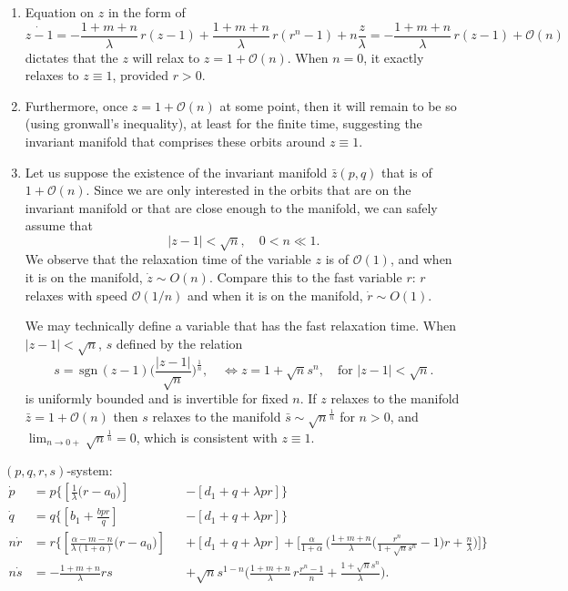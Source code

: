 \documentclass[a4paper,11pt]{article}
\def\sgn{\,\textrm{sgn}\,}
\def\dpp{\dot{p}}
\def\dqq{\dot{q}}
\def\drr{\dot{r}}
\def\dss{\dot{s}}
\begin{document}
\begin{enumerate}
 \item  Equation on $z$ in the form of
 $$ \dot{z-1} = -\frac{1+m+n}{\lambda}\, r (z-1) + \frac{1+m+n}{\lambda}\, r(r^n-1) + n\frac{z}{\lambda} = -\frac{1+m+n}{\lambda}\, r (z-1) + \mathcal{O}(n)$$
 dictates that the $z$ will relax to $z=1 + \mathcal{O}(n)$. When $n=0$, it exactly relaxes to $z\equiv1$, provided $r>0$.
 \item Furthermore, once $z = 1+\mathcal{O}(n)$ at some point, then it will remain to be so (using gronwall's inequality), at least for the finite time, suggesting the invariant manifold that comprises these orbits around $z\equiv1$.
 \item Let us suppose the existence of the invariant manifold $\bar{z}(p,q)$ that is of $1+\mathcal{O}(n)$. Since we are only interested in the orbits that are on the invariant manifold or that are close enough to the manifold, we can safely assume that
 $$ |z-1| < \sqrt{n}, \quad 0<n\ll1.$$
 We observe that the relaxation time of the variable $z$ is of $\mathcal{O}(1)$, and when it is on the manifold, $\dot{z} \sim O(n)$. Compare this to the fast variable $r$: $r$ relaxes with speed $\mathcal{O}(1/n)$ and when it is on the manifold, $\dot{r} \sim O(1)$.
 
 We may technically define a variable that has the fast relaxation time.  When $|z-1| < \sqrt{n}$, $s$ defined by the relation 
 $$ s = \sgn{(z-1)}\Big(\frac{|z-1|}{\sqrt{n}}\Big)^{\frac{1}{n}}, \quad \Longleftrightarrow z = 1+\sqrt{n}s^n, \quad \text{for $|z-1|<\sqrt{n}.$}$$
 is uniformly bounded and is invertible for fixed $n$. If $z$ relaxes to the manifold $\bar{z}=1+\mathcal{O}(n)$ then $s$ relaxes to the manifold $\bar{s}\sim \sqrt{n}^{\frac{1}{n}}$ for $n>0$, and $\displaystyle \lim_{n \rightarrow 0+} \sqrt{n}^{\frac{1}{n}}=0$, which is consistent with $z\equiv1$.
\end{enumerate}




$(p,q,r,s)$-system:
\begin{align*}
 \dpp&=p\bigg\{\left[\frac{1}{\lambda }\Big(r-a_0\Big)\right] & &-\left[d_1 + q + \lambda pr\right]\bigg\}\\
 \dqq&=q\bigg\{\left[b_1 +\frac{bpr}{q}\right] & &-\left[d_1 + q + \lambda pr\right]\bigg\}\\ 
 n\drr&=r\bigg\{\left[\frac{\alpha-m-n}{\lambda(1+\alpha) }\Big(r-a_0\Big)\right]& &+\left[d_1 + q + \lambda pr\right]+ \Big[\frac{\alpha}{1+\alpha}\, \Big(\frac{1+m+n}{\lambda} \Big(\frac{r^n}{1+\sqrt{n}s^n}-1\Big)r + \frac{n}{\lambda}\Big)\Big]\bigg\}\\
 n\dss&=-\frac{1+m+n}{\lambda}rs & &+ \sqrt{n}s^{1-n}\Big( \frac{1+m+n}{\lambda} \, r\frac{r^n-1}{n} + \frac{1+\sqrt{n}s^n}{\lambda}\Big).
\end{align*}
\end{document}
